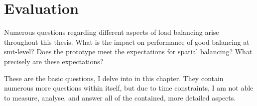 \chapter{Evaluation}
\label{sec:evaluation}


Numerous questions regarding different aspects of load balancing arise
throughout this thesis.
What is the impact on performance of good balancing at \gls{smt}-level?
Does the prototype meet the expectations for spatial balancing?
What precisely are these expectations?

These are the basic questions, I delve into in this chapter.
They contain numerous more questions within itself, but due to time
constraints, I am not able to measure, analyse, and answer all of the
contained, more detailed aspects.




\begin{comment}

Is behaviour aware load balancing on L4Re better than behaviour unaware
balancing?
What differences are observable between different SMT assignment schemes?

When compared with Linux \gls{cfs} scheduler, how different is the
performance?

Of interest are performance degradation compared to solo execution, when
executed in parallel with other applications.
Also, the related work suggests that the execution time is much more
deterministic, hence the maximum and minimum execution times are close
together.


\end{comment}


\cleardoublepage

